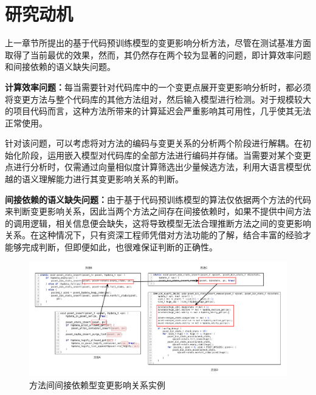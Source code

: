 \section{研究动机}

上一章节所提出的基于代码预训练模型的变更影响分析方法，尽管在测试基准方面取得了当前最优的效果，然而，其仍然存在两个较为显著的问题，即计算效率问题和间接依赖的语义缺失问题。

\textbf{计算效率问题：}每当需要针对代码库中的一个变更点展开变更影响分析时，都必须将变更方法与整个代码库的其他方法组对，然后输入模型进行检测。对于规模较大的项目代码而言，这种方法所带来的计算延迟会严重影响其可用性，几乎使其无法正常使用。

针对该问题，可以考虑将对方法的编码与变更关系的分析两个阶段进行解耦。在初始化阶段，运用嵌入模型对代码库的全部方法进行编码并存储。当需要对某个变更点进行分析时，仅需通过向量相似度计算筛选出少量候选方法，利用大语言模型优越的语义理解能力进行其变更影响关系的判断。

\textbf{间接依赖的语义缺失问题：}由于基于代码预训练模型的算法仅依据两个方法的代码来判断变更影响关系，因此当两个方法之间存在间接依赖时，如果不提供中间方法的调用逻辑，相关信息便会缺失，这将导致模型无法合理推断方法之间的变更影响关系。在这种情况下，只有资深工程师凭借对方法功能的了解，结合丰富的经验才能够完成判断，但即便如此，也很难保证判断的正确性。

\begin{figure}[htbp]
\centering
\includegraphics[width = 1\textwidth]{figures/3_间接依赖例子.pdf}
\caption{方法间间接依赖型变更影响关系实例}
\label{3_间接依赖例子}
\end{figure}


